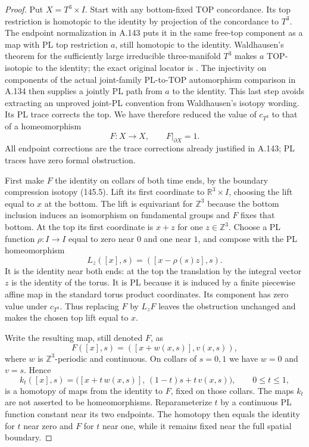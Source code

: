 \begin{proof}
Put $X=T^3\times I$. Start with any bottom-fixed TOP concordance.
Its top restriction is homotopic to the identity by projection of
the concordance to $T^3$. The endpoint normalization in A.143 puts
it in the same free-top component as a map with PL top restriction
$a$, still homotopic to the identity. Waldhausen's theorem for the
sufficiently large irreducible three-manifold $T^3$ makes $a$
TOP-isotopic to the identity; the exact original locator is
\cite[Theorem 7.1, printed pp.~80--81]{Waldhausen1968}.
The injectivity on components of the actual joint-family
PL-to-TOP automorphism comparison in A.134 then supplies a jointly
PL path from $a$ to the identity. This last step avoids extracting
an unproved joint-PL convention from Waldhausen's isotopy wording.
Its PL trace corrects the top. We have therefore reduced the value
of $c_{T^3}$ to that of a homeomorphism
\[
                  F:X\longrightarrow X,\qquad
                         F|_{\partial X}=1.
 \tag{146.2}
\]
All endpoint corrections are the trace corrections already justified
in A.143; PL traces have zero formal obstruction.

First make $F$ the identity on collars of both time ends, by the
boundary compression isotopy (145.5). Lift its first coordinate to
$\mathbb R^3\times I$, choosing the lift equal to $x$ at the bottom.
The lift is equivariant for $\mathbb Z^3$ because the bottom
inclusion induces an isomorphism on fundamental groups and $F$
fixes that bottom. At the top its first coordinate is $x+z$ for
one $z\in\mathbb Z^3$. Choose a PL function
$\rho:I\to I$ equal to zero near $0$ and one near $1$, and compose
with the PL homeomorphism
\[
        L_z([x],s)=([x-\rho(s)z],s).
 \tag{146.3}
\]
It is the identity near both ends: at the top the translation by
the integral vector $z$ is the identity of the torus. It is PL
because it is induced by a finite piecewise affine map in the
standard torus product coordinates. Its component has zero value
under $c_{T^3}$. Thus replacing $F$ by $L_zF$ leaves the obstruction
unchanged and makes the chosen top lift equal to $x$.

Write the resulting map, still denoted $F$, as
\[
                 F([x],s)=([x+w(x,s)],v(x,s)),
 \tag{146.4}
\]
where $w$ is $\mathbb Z^3$-periodic and continuous. On collars of
$s=0,1$ we have $w=0$ and $v=s$. Hence
\[
 k_t([x],s)=
   \bigl([x+t\,w(x,s)],\, (1-t)s+t\,v(x,s)\bigr),
          \qquad 0\le t\le1,
 \tag{146.5}
\]
is a homotopy of maps from the identity to $F$, fixed on those
collars. The maps $k_t$ are not asserted to be homeomorphisms.
Reparameterize $t$ by a continuous PL function constant near its
two endpoints. The homotopy then equals the identity for $t$
near zero and $F$ for $t$ near one, while it remains fixed near
the full spatial boundary.


\end{proof}
